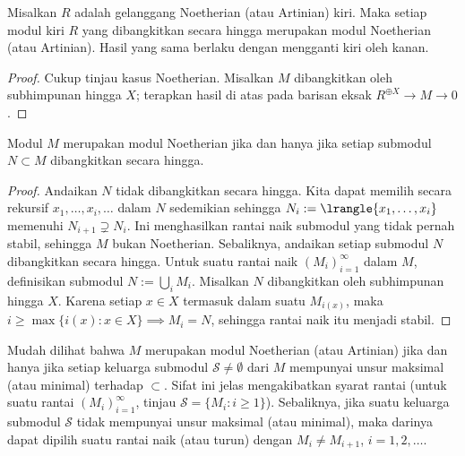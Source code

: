 \begin{proposition}
	Misalkan $R$ adalah gelanggang Noetherian (atau Artinian) kiri. Maka setiap modul kiri $R$ yang dibangkitkan secara hingga merupakan modul Noetherian (atau Artinian). Hasil yang sama berlaku dengan mengganti kiri oleh kanan.
\end{proposition}
\begin{proof}
	Cukup tinjau kasus Noetherian. Misalkan $M$ dibangkitkan oleh subhimpunan hingga $X$; terapkan hasil di atas pada barisan eksak $R^{\oplus X} \to M \to 0$.
\end{proof}

\begin{lemma}\label{prop:fg-noetherian}
	Modul $M$ merupakan modul Noetherian jika dan hanya jika setiap submodul $N \subset M$ dibangkitkan secara hingga.
\end{lemma}
\begin{proof}
	Andaikan $N$ tidak dibangkitkan secara hingga. Kita dapat memilih secara rekursif $x_1, \ldots, x_i, \ldots$ dalam $N$ sedemikian sehingga $N_i := \lrangle{x_1, \ldots, x_i}$ memenuhi $N_{i+1} \supsetneq N_i$. Ini menghasilkan rantai naik submodul yang tidak pernah stabil, sehingga $M$ bukan Noetherian. Sebaliknya, andaikan setiap submodul $N$ dibangkitkan secara hingga. Untuk suatu rantai naik $(M_i)_{i=1}^\infty$ dalam $M$, definisikan submodul $N := \bigcup_i M_i$. Misalkan $N$ dibangkitkan oleh subhimpunan hingga $X$. Karena setiap $x \in X$ termasuk dalam suatu $M_{i(x)}$, maka $i \geq \max\{i(x) : x \in X\} \implies M_i = N$, sehingga rantai naik itu menjadi stabil.
\end{proof}

\begin{remark}\label{rem:noetherian-mod-S}
	Mudah dilihat bahwa $M$ merupakan modul Noetherian (atau Artinian) jika dan hanya jika setiap keluarga submodul $\mathcal{S} \neq \emptyset$ dari $M$ mempunyai unsur maksimal (atau minimal) terhadap $\subset$. Sifat ini jelas mengakibatkan syarat rantai (untuk suatu rantai $(M_i)_{i=1}^\infty$, tinjau $\mathcal{S} = \{M_i : i \geq 1 \}$). Sebaliknya, jika suatu keluarga submodul $\mathcal{S}$ tidak mempunyai unsur maksimal (atau minimal), maka darinya dapat dipilih suatu rantai naik (atau turun) dengan $M_i \neq M_{i+1}$, $i=1,2, \ldots$.
\end{remark}

